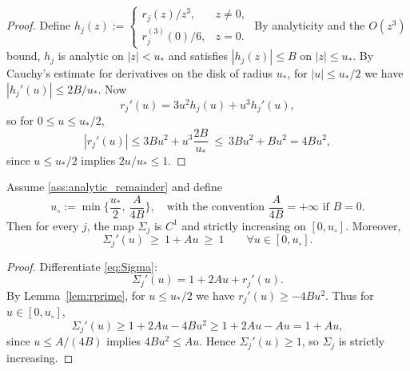 \begin{proof}
Define $h_j(z):=\begin{cases} r_j(z)/z^3,& z\neq 0,\\ r_j^{(3)}(0)/6,& z=0.\end{cases}$
By analyticity and the $O(z^3)$ bound, $h_j$ is analytic on $|z|<u_\ast$ and satisfies $|h_j(z)|\le B$ on $|z|\le u_\ast$.
By Cauchy's estimate for derivatives on the disk of radius $u_\ast$,
for $|u|\le u_\ast/2$ we have $|h_j'(u)|\le 2B/u_\ast$.
Now
\[
r_j'(u)=3u^2 h_j(u)+u^3 h_j'(u),
\]
so for $0\le u\le u_\ast/2$,
\[
|r_j'(u)|\le 3B u^2 + u^3\frac{2B}{u_\ast}\ \le\ 3B u^2 + B u^2 = 4B u^2,
\]
since $u\le u_\ast/2$ implies $2u/u_\ast\le 1$.
\end{proof}

\begin{lemma}\label{lem:Sigma_mono}
Assume \ref{ass:analytic_remainder} and define
\[
u_\circ := \min\Big\{\frac{u_\ast}{2},\ \frac{A}{4B}\Big\},
\quad\text{with the convention } \frac{A}{4B}=+\infty\text{ if }B=0.
\]
Then for every $j$, the map $\Sigma_j$ is $C^1$ and strictly increasing on $[0,u_\circ]$.
Moreover,
\begin{equation}\label{eq:Sigma_deriv_lower}
\Sigma_j'(u)\ \ge\ 1 + A u\ \ge\ 1
\qquad \forall u\in[0,u_\circ].
\end{equation}
\end{lemma}

\begin{proof}
Differentiate \eqref{eq:Sigma}:
\[
\Sigma_j'(u)=1+2A u + r_j'(u).
\]
By Lemma~\ref{lem:rprime}, for $u\le u_\ast/2$ we have $r_j'(u)\ge -4B u^2$.
Thus for $u\in[0,u_\circ]$,
\[
\Sigma_j'(u)\ge 1+2A u -4B u^2 \ge 1+2A u - A u = 1 + A u,
\]
since $u\le A/(4B)$ implies $4B u^2\le A u$.
Hence $\Sigma_j'(u)\ge 1$, so $\Sigma_j$ is strictly increasing.
\end{proof}

